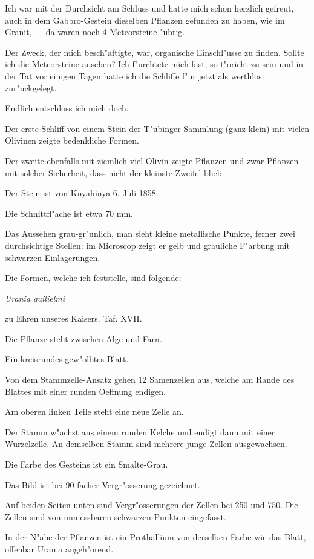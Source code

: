 \documentclass[a4paper, 11pt, oneside, german]{article}
\begin{document}
Ich war mit der Durchsicht am Schluss und hatte mich schon herzlich gefreut, auch in dem Gabbro-Gestein dieselben Pflanzen gefunden zu haben, wie im Granit, --- da waren noch 4 Meteorsteine "ubrig.

Der Zweck, der mich besch"aftigte, war, organische Einschl"usse zu finden. Sollte ich die Meteorsteine ansehen? Ich f"urchtete mich fast, so t"oricht zu sein und in der Tat vor einigen Tagen hatte ich die Schliffe f"ur jetzt als werthlos zur"uckgelegt.

Endlich entschloss ich mich doch.

Der erste Schliff von einem Stein der T"ubinger Sammlung (ganz klein) mit vielen Olivinen zeigte bedenkliche Formen.

Der zweite ebenfalls mit ziemlich viel Olivin zeigte Pflanzen und zwar Pflanzen mit solcher Sicherheit, dass nicht der kleinste Zweifel blieb.

Der Stein ist von Knyahinya 6. Juli 1858.

Die Schnittfl"ache ist etwa 70 mm.

Das Aussehen grau-gr"unlich, man sieht kleine metallische Punkte, ferner zwei durchsichtige Stellen: im Microscop zeigt er gelb und grauliche F"arbung mit schwarzen Einlagerungen.

Die Formen, welche ich feststelle, sind folgende:

\emph{Urania guilielmi}

zu Ehren unseres Kaisers. Taf. XVII.

Die Pflanze steht zwischen Alge und Farn.

Ein kreisrundes gew"olbtes Blatt.

Von dem Stammzelle-Ansatz gehen 12 Samenzellen aus, welche am Rande des Blattes mit einer runden Oeffnung endigen.

Am oberen linken Teile steht eine neue Zelle an.

Der Stamm w"achst aus einem runden Kelche und endigt dann mit einer Wurzelzelle. An demselben Stamm sind mehrere junge Zellen ausgewachsen.

Die Farbe des Gesteins ist ein Smalte-Grau.

Das Bild ist bei 90 facher Vergr"osserung gezeichnet.

Auf beiden Seiten unten sind Vergr"osserungen der Zellen bei 250 und 750. Die Zellen sind von unmessbaren schwarzen Punkten eingefasst.

In der N"ahe der Pflanzen ist ein Prothallium von derselben Farbe wie das Blatt, offenbar Urania angeh"orend.
\end{document}
